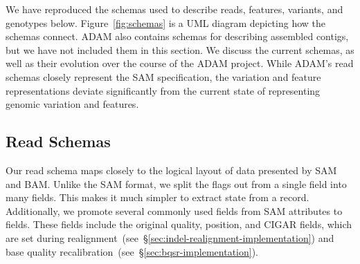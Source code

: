 \documentclass[phd]{ucbthesis}
\begin{document}
We have reproduced the schemas used to describe reads, features, variants, and
genotypes below. Figure~\ref{fig:schemas} is a UML diagram depicting how the
schemas connect. \textsc{ADAM} also contains schemas for describing assembled
contigs, but we have not included them in this section. We discuss the current
schemas, as well as their evolution over the course of the \textsc{ADAM}
project. While \textsc{ADAM}'s read schemas closely represent the \textsc{SAM}
specification, the variation and feature representations deviate significantly
from the current state of representing genomic variation and features.

\subsection{Read Schemas}
\label{sec:read-schemas}

Our read schema maps closely to the logical layout of data presented by
\textsc{SAM} and \textsc{BAM}. Unlike the \textsc{SAM} format, we split the
flags out from a single field into many fields. This makes it much simpler to
extract state from a record. Additionally, we promote several commonly used
fields from \textsc{SAM} attributes to fields. These fields include the original
quality, position, and CIGAR fields, which are set during
realignment~(see~\S\ref{sec:indel-realignment-implementation}) and base quality
recalibration~(see~\S\ref{sec:bqsr-implementation}).
\end{document}

